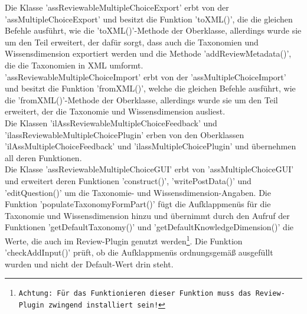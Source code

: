 \documentclass[a4paper]{scrreprt}
\begin{document}
Die Klasse 'assReviewableMultipleChoiceExport' erbt von der 'assMultipleChoiceExport' und besitzt die Funktion 'toXML()', die die gleichen Befehle ausführt, wie die 'toXML()'-Methode der Oberklasse, allerdings wurde sie um den Teil erweitert, der dafür sorgt, dass auch die Taxonomien und Wissensdimension exportiert werden und die Methode 'addReviewMetadata()', die die Taxonomien in XML umformt.\\
'assReviewableMultipleChoiceImport' erbt von der 'assMultipleChoiceImport' und besitzt die Funktion 'fromXML()', welche die gleichen Befehle ausführt, wie die 'fromXML()'-Methode der Oberklasse, allerdings wurde sie um den Teil erweitert, der die Taxonomie und Wissensdimension ausliest.\\ 
Die Klassen 'ilAssReviewableMultipleChoiceFeedback' und 'ilassReviewableMultipleChoicePlugin' erben von den Oberklassen 'ilAssMultipleChoiceFeedback' und 'ilassMultipleChoicePlugin' und übernehmen all deren Funktionen.\\
Die Klasse 'assReviewableMultipleChoiceGUI' erbt von 'assMultipleChoiceGUI' und erweitert deren Funktionen '\textunderscore \textunderscore construct()', 'writePostData()' und 'editQuestion()' um die Taxonomie- und Wissensdimension-Angaben. Die Funktion 'populateTaxonomyFormPart()' fügt die Aufklappmenüs für die Taxonomie und Wissensdimension hinzu und übernimmt durch den Aufruf der Funktionen 'getDefaultTaxonomy()' und 'getDefaultKnowledgeDimension()' die Werte, die auch im Review-Plugin genutzt werden\footnote{\texttt{Achtung: Für das Funktionieren dieser Funktion muss das Review-Plugin zwingend installiert sein!}}. Die Funktion 'checkAddInput()' prüft, ob die Aufklappmenüs ordnungsgemäß ausgefüllt wurden und nicht der Default-Wert drin steht.\\
\end{document}
